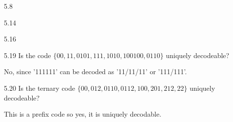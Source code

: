 \documentclass[12pt, a4paper]{article}
\begin{document}
\begin{prob}{5.8}
\end{prob}
\begin{sol}
\end{sol}
\bigskip


\begin{prob}{5.14}
\end{prob}
\begin{sol}
\end{sol}
\bigskip


\begin{prob}{5.16}
\end{prob}
\begin{sol}
\end{sol}
\bigskip


\begin{prob}{5.19}
Is the code $\{00, 11, 0101, 111, 1010, 100100, 0110\}$ uniquely decodeable?
\end{prob}
\begin{sol}
No, since '111111' can be decoded as '11/11/11' or '111/111'.
\end{sol}
\bigskip


\begin{prob}{5.20}
Is the ternary code $\{00, 012, 0110, 0112, 100, 201, 212, 22\}$ uniquely decodeable?
\end{prob}
\begin{sol}
This is a prefix code so yes, it is uniquely decodable.
\end{sol}
\bigskip

\begin{prob}{}
\end{prob}
\begin{sol}
\end{sol}
\bigskip
\end{document}
